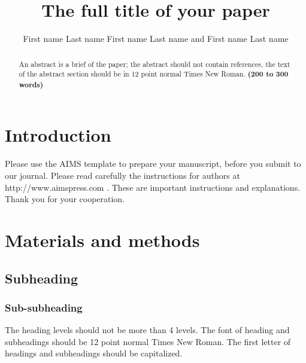 \documentclass{aims}
\numberwithin{equation}{section}
\begin{document}
\linenumbers

\title{The full title of your paper}

\author{%
  First name Last name
  First name Last name
  and
  First name Last name\corrauth
}


\address{%
  }


\begin{abstract}
An abstract is a brief of the paper; the abstract should not 
contain references, the text of the abstract section should be
in 12 point normal Times New Roman.
\textbf{(200 to 300 words)}
\end{abstract}


\maketitle

\section{Introduction}

Please use the AIMS template to prepare your manuscript, 
before you submit to our journal. 
Please read carefully the instructions for authors at
http://www.aimspress.com \cite{authour1}. 
These are important instructions and explanations. 
Thank you for your cooperation.


\section{Materials and methods}
\subsection{Subheading}

\subsubsection{Sub-subheading}
The heading levels should not be more than 4 levels. 
The font of heading and subheadings should be 12 point 
normal Times New Roman. The first letter of headings 
and subheadings should be capitalized.
\end{document}
